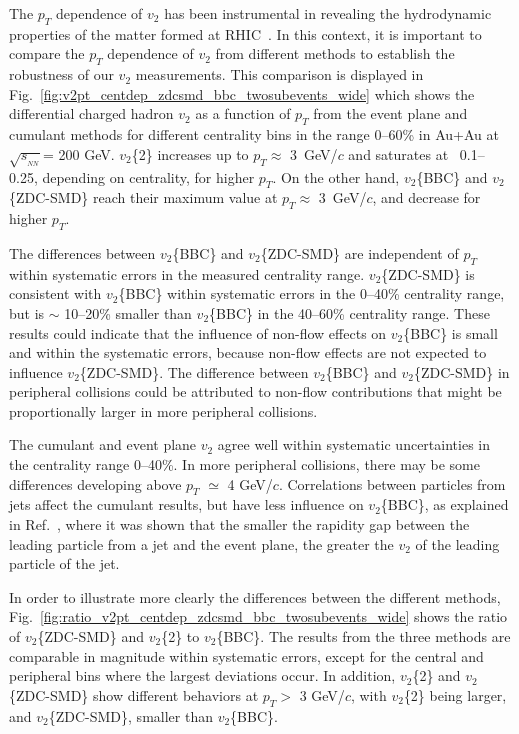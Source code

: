 \documentclass[aps,prc,superscriptaddress,showpacs,floatfix,twocolumn]{revtex4}
\newcommand \gevc{GeV/$c$\xspace}
\newcommand \pt{\mbox{$p_T$}\xspace}
\newcommand \sqsn{\mbox{$\sqrt{s_{_{NN}}}$}\xspace}
\newcommand \Fig{Fig.\xspace}
\newcommand \Au{{Au+Au}\xspace}
\begin{document}
The \pt dependence of $v_2$ has been instrumental in revealing 
the hydrodynamic properties of the matter formed at 
RHIC~\cite{Adler:2003kt,Adams:2003am}. In this context, it is 
important to compare the \pt dependence of $v_2$ from different 
methods to establish the robustness of our $v_2$ measurements. 
This comparison is displayed in 
Fig.~\ref{fig:v2pt_centdep_zdcsmd_bbc_twosubevents_wide} which 
shows the differential charged hadron $v_2$ as a function of \pt 
from the event plane and cumulant methods for different 
centrality bins in the range 0--60\% in \Au at \sqsn = 200 GeV. 
$v_2$\{2\} increases up to \pt $\approx$ 3~\gevc and saturates 
at \mbox{~0.1--0.25}, depending on centrality, for higher \pt. 
On the other hand, $v_2$\{BBC\} and $v_2$\{ZDC-SMD\} reach their 
maximum value at \pt $\approx$ 3~\gevc, and decrease for higher 
\pt.

The differences between $v_2$\{BBC\} and $v_2$\{ZDC-SMD\} are 
independent of \pt within systematic errors in the measured 
centrality range. $v_2$\{ZDC-SMD\} is consistent with 
$v_2$\{BBC\} within systematic errors in the 0--40\% centrality 
range, but is $\sim$ 10--20\% smaller than $v_2$\{BBC\} in the 
40--60\% centrality range. These results could indicate that the 
influence of non-flow effects on $v_2$\{BBC\} is small and 
within the systematic errors, because non-flow effects are not 
expected to influence $v_2$\{ZDC-SMD\}. The difference between 
$v_2$\{BBC\} and $v_2$\{ZDC-SMD\} in peripheral collisions could 
be attributed to non-flow contributions that might be 
proportionally larger in more peripheral collisions.

The cumulant and event plane $v_2$ agree well within systematic 
uncertainties in the centrality range 0--40\%. In more 
peripheral collisions, there may be some differences developing 
above $p_T$ $\simeq$ 4 \gevc. Correlations between particles 
from jets affect the cumulant results, but have less influence 
on $v_2$\{BBC\}, as explained in Ref.~\cite{Jia:2006sb}, where 
it was shown that the smaller the rapidity gap between the 
leading particle from a jet and the event plane, the greater the 
$v_2$ of the leading particle of the jet.

In order to illustrate more clearly the differences between the 
different methods, 
\Fig~\ref{fig:ratio_v2pt_centdep_zdcsmd_bbc_twosubevents_wide} 
shows the ratio of $v_2$\{ZDC-SMD\} and $v_2$\{2\} to 
$v_2$\{BBC\}. The results from the three methods are comparable 
in magnitude within systematic errors, except for the central 
and peripheral bins where the largest deviations occur. In 
addition, $v_2$\{2\} and $v_2$\{ZDC-SMD\} show different 
behaviors at \pt $>$ 3 \gevc, with $v_2$\{2\} being larger, and 
$v_2$\{ZDC-SMD\}, smaller than $v_2$\{BBC\}.
\end{document}
